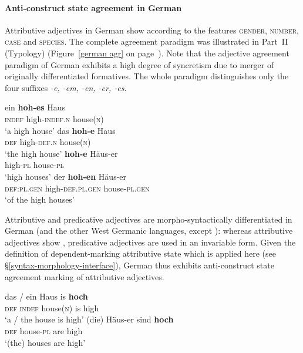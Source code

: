 \paragraph*{Anti\hyp{}construct state agreement in German}
Attributive adjectives in German show  according to the features \textsc{gender, number, case} and \textsc{species}. The complete agreement paradigm was illustrated in Part~II (Typology) (Figure~\ref{german agr} on page~\pageref{german agr}). Note that the adjective agreement paradigm of German exhibits a high degree of syncretism due to merger of originally differentiated formatives. The whole paradigm distinguishes only the four suffixes \textit{-e, -em, -en, -er, -es}.
\begin{exe}
\begin{xlist}
\ex
\gll	ein \textbf{hoh-es} Haus\\
	\textsc{indef} high-\textsc{indef.n} house(\textsc{n})\\
\glt	‘a high house’
\ex	
\gll	das \textbf{hoh-e} Haus\\
	\textsc{def} high-\textsc{def.n} house(\textsc{n})\\
\glt	‘the high house’
\ex	
\gll	\textbf{hoh-e} Häus-er\\
	high-\textsc{pl} house-\textsc{pl}\\
\glt	‘high houses’
\ex	
\gll	der \textbf{hoh-en} Häus-er\\
	\textsc{def:pl.gen} high-\textsc{def.pl.gen} house-\textsc{pl.gen}\\
\glt	‘of the high houses’
\end{xlist}
\end{exe}
Attributive and predicative adjectives are morpho-syntactically differentiated in German (and the other West Germanic languages, except ): whereas attributive adjectives show , predicative adjectives are used in an invariable form. Given the definition of dependent\hyp{}marking attributive state which is applied here (see \S\ref{syntax-morphology-interface}), German thus exhibits anti\hyp{}construct state agreement marking of attributive adjectives.
\begin{exe}
\begin{xlist}
\ex
\gll	das / ein Haus is \textbf{hoch}\\
	\textsc{def} {} \textsc{indef} house(\textsc{n}) is high\\
\glt	‘a / the house is high’
\ex	
\gll	(die) Häus-er sind \textbf{hoch}\\
	\textsc{def} house-\textsc{pl} are high\\
\glt	‘(the) houses are high’
\end{xlist}
\end{exe}

